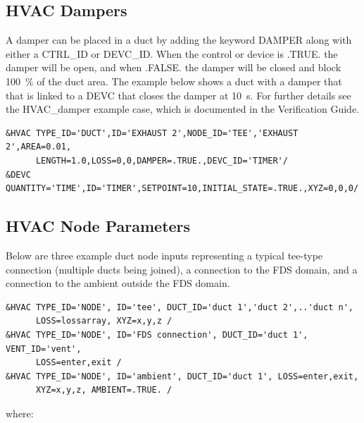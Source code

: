 \documentclass[11pt]{book}
\begin{document}
\subsection{HVAC Dampers}
\label{info:HVACdamper}

A damper can be placed in a duct by adding the keyword {\ct DAMPER} along with either a {\ct CTRL\_ID} or {\ct DEVC\_ID}.  When the control or device is {\ct .TRUE.} the damper will be open, and when {\ct .FALSE.} the damper will be closed and block 100~\% of the duct area.  The example below shows a duct with a damper that that is linked to a {\ct DEVC} that closes the damper at 10~s. For further details see the {\ct HVAC\_damper} example case, which is documented in the
Verification Guide.

\begin{lstlisting}
&HVAC TYPE_ID='DUCT',ID='EXHAUST 2',NODE_ID='TEE','EXHAUST 2',AREA=0.01,
      LENGTH=1.0,LOSS=0,0,DAMPER=.TRUE.,DEVC_ID='TIMER'/
&DEVC QUANTITY='TIME',ID='TIMER',SETPOINT=10,INITIAL_STATE=.TRUE.,XYZ=0,0,0/
\end{lstlisting}

\subsection{HVAC Node Parameters}
\label{info:HVACnode}

Below are three example duct node inputs representing a typical tee-type connection (multiple ducts being joined), a connection to the FDS domain, and a connection to the ambient outside the FDS domain.

\begin{lstlisting}
&HVAC TYPE_ID='NODE', ID='tee', DUCT_ID='duct 1','duct 2',..'duct n',
      LOSS=lossarray, XYZ=x,y,z /
&HVAC TYPE_ID='NODE', ID='FDS connection', DUCT_ID='duct 1', VENT_ID='vent',
      LOSS=enter,exit /
&HVAC TYPE_ID='NODE', ID='ambient', DUCT_ID='duct 1', LOSS=enter,exit,
      XYZ=x,y,z, AMBIENT=.TRUE. /
\end{lstlisting}

\noindent where:
\end{document}
